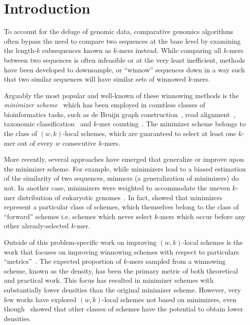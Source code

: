 \documentclass{article}
\newcommand{\kmer}{{$k$-mer}}
\newcommand{\kmers}{{$k$-mers}}
\begin{document}


\section{Introduction}
To account for the deluge of genomic data, comparative genomics algorithms often bypass the need to compare two sequences at the base level by examining the length-$k$ subsequences known as \kmers{} instead. While comparing all \kmers{} between two sequences is often infeasible or at the very least inefficient, methods have been developed to downsample, or ``winnow'' sequences down in a way such that two similar sequences will have similar sets of winnowed \kmers{}\cite{schleimer2003winnowing}. 

Arguably the most popular and well-known of these winnowing methods is the \emph{minimizer scheme}~\citep{roberts2004preprocessor, schleimer2003winnowing} which has been employed in countless classes of bioinformatics tasks, such as de Bruijn graph construction~\citep{rautiainen2021mbg, ekim2021minimizer}, read alignment~\citep{li2018minimap2}, taxonomic classification~\citep{wood2019improved} and \kmer{} counting~\citep{deorowicz2015kmc}. The minimizer scheme belongs to the class of $(w,k)$-local schemes, which are guaranteed to select at least one \kmer{} out of every $w$ consecutive \kmers{}. 

More recently, several approaches have emerged that generalize or improve upon the minimizer scheme. For example, while minimizers lead to a biased estimation of the similarity of two sequences\citep{belbasi2022minimizer}, minmers (a generalization of minimizers) do not\citep{kille2023minmers}. In another case, minimizers were weighted to accommodate the uneven \kmer{} distribution of eukaryotic genomes~\citep{jain2020weighted}. In fact, \cite{marccais2018asymptotically} showed that minimizers represent a particular class of schemes, which themselves belong to the class of ``forward'' schemes i.e. schemes which never select \kmers{} which occur before any other already-selected \kmer{}. 

Outside of this problem-specific work on improving $(w,k)$-local schemes is the work that focuses on improving winnowing schemes with respect to particulars ``metrics''~\citep{shaw2022theory}. The expected proportion of \kmers{} sampled from a winnowing scheme, known as the density, has been the primary metric of both theoretical and practical work. This focus has resulted in minimizer schemes with substantially lower densities than the original minimizer scheme. However, very few works have explored $(w,k)$-local schemes not based on minimizers, even though~\cite{marccais2018asymptotically} showed that other classes of schemes have the potential to obtain lower densities. 
\end{document}
